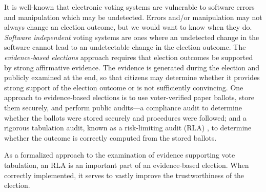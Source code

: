 It is well-known that electronic voting systems are vulnerable to software errors and manipulation which may be undetected. Errors and/or manipulation may not always change an election outcome, but we would want to know when they do. {\em Software independent} voting systems \cite{SI-Wack,rivest2008notion} are ones where an undetected change in the software cannot lead to an undetectable change in the election outcome. The {\em evidence-based elections} \cite{evidence-based} approach requires that election outcomes be supported by strong affirmative evidence. The evidence is generated during the election and publicly examined at the end, so that citizens may determine whether it provides strong support of the election outcome or is not sufficiently convincing. 
One approach to evidence-based elections is to use voter-verified paper ballots, store them securely, and perform public audits---a compliance audit to determine whether the ballots were stored securely and procedures were followed; and a rigorous tabulation audit, known as a risk-limiting audit (RLA) \cite{RLA}, to determine whether the outcome is correctly computed from the stored ballots.  

As a formalized approach to the examination of evidence supporting vote tabulation, an RLA is an important part of an evidence-based election. When correctly implemented, it serves to vastly improve the trustworthiness of the election. 

